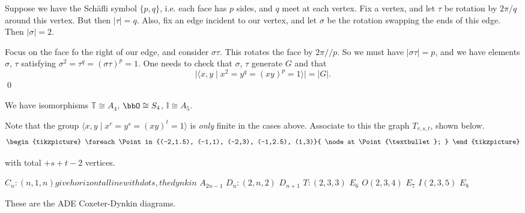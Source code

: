\pfsk Suppose we have the Sch\"afli symbol $\{p,q\}$, i.e. each face has $p$ sides, and $q$ meet at each vertex. Fix a vertex, and let $\tau$ be rotation by $2\pi/q$ around this vertex. But then $|\tau|=q$. Also, fix an edge incident to our vertex, and let $\sigma$ be the rotation swapping the ends of this edge. Then $|\sigma|=2$. 


Focus on the face fo the right of our edge, and consider $\sigma\tau$. This rotates the face by $2\pi//p$. So we must have $|\sigma\tau|=p$, and we have elements $\sigma$, $\tau$ satisfying $\sigma^2=\tau^q=(\sigma\tau)^p=1$. One needs to check that $\sigma$, $\tau$ generate $G$ and that
	\[
	|\langle x,y \;|\; x^2=y^q=(xy)^p=1 \rangle| = |G|.
	\]
\qed \\

 
\begin{cor}
We have isomorphisms $\mathbb{T} \cong A_4$, $\bbO \cong S_4$, $\mathbb{I} \cong A_5$. 
\end{cor}

 Note that the group $\langle x,y \;|\; x^r=y^s=(xy)^t=1\rangle$ is \emph{only} finite in the cases above. Associate to this the graph $T_{r,s,t}$, shown below.
 	\[
	\begin{tikzpicture}
	\foreach \Point in {(-2,1.5), (-1,1), (-2,3), (-1,2.5), (1,3)}{
    \node at \Point {\textbullet};
}
	\end{tikzpicture}
	\]

with total $+s+t-2$ vertices. 

$C_n: (n,1,n) give horizontal line with dots, the dynkin$ $A_{2n-1}$
$D_n: (2,n,2)$  $D_{n+1}$
$T: (2,3,3)$ $E_6$
$O(2,3,4)$ $E_7$
$I(2,3,5)$ $E_8$

These are the ADE Coxeter-Dynkin diagrams. 














